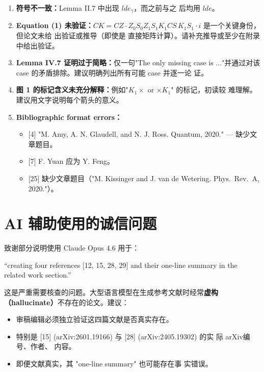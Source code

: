 \documentclass[10pt,a4paper]{article}
\def\mathrm#1{#1}%
\begin{document}
\begin{enumerate}[label=(\roman*)]
\item \textbf{符号不一致：}Lemma
  II.7 中出现 $\mathrm{lde}_\gamma$，而之前与之
  后均用 $\mathrm{lde}$。
 
\item \textbf{Equation (1)
    未验证：}$\mathrm{CK} = \mathrm{CZ} \cdot Z_0 S_0 Z_1 S_1 K_1
  \mathrm{CS}\, K_1 S_1 \cdot i$ 是一个关键身份，但论文未给
  出验证或推导（即使是
  直接矩阵计算）。请补充推导或至少在附录中给出验证。
 
\item \textbf{Lemma IV.7 证明过于简略：}仅一句"The only missing case is
  ..."并通过对该 case 的矛盾排除。建议明确列出所有可能 case 并逐一论
  证。
 
\item \textbf{图 1 的标记含义未充分解释：}例如"$K_1\times$ or $\times
  K_1$"  的标记，初读较
  难理解。建议用文字说明每个箭头的意义。
 
\item \textbf{Bibliographic format  errors：}
\begin{itemize}
\item {[4]} "M. Amy, A. N. Glaudell, and N. J. Ross. Quantum, 2020." — 缺少文章题目。
\item {[7]} F. Yuan 应为 Y. Feng。
\item {[25]} 缺少文章题目（"M. Kissinger and J. van de Wetering. Phys.\ Rev.\ A, 2020."）。
\end{itemize}
\end{enumerate}
 
\section{AI 辅助使用的诚信问题}
 
致谢部分说明使用 Claude Opus 4.6 用于：
 
``creating four references  [12, 15, 28, 29] and their one-line summary in the
related work section.''
 
这是严重需要核查的问题。大型语言模型在生成参考文献时经常\textbf{虚构（hallucinate）}不存在的论文。建议：
\begin{itemize}
\item 审稿编辑必须独立验证这四篇文献是否真实存在。
\item 特别是 [15] (arXiv:2601.19166) 与 [28] (arXiv:2405.19302) 的实
  际 arXiv编号、作者、 内容。
\item 即便文献真实，其 "one-line summary" 也可能存在事
  实错误。
\end{itemize}
 
\end{document}
